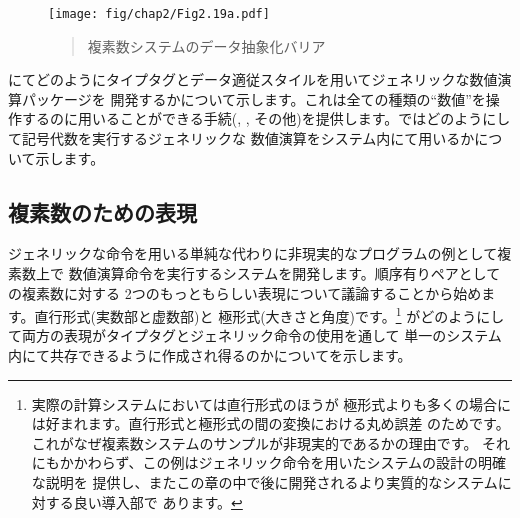 \begin{figure}[tb]
\label{Figure 2.19}
\centering
\begin{comment}
\begin{quote}
\heading{Figure 2.19:} Data-abstraction barriers in the complex-number system.

\begin{example}
           Programs that use complex numbers
  +-------------------------------------------------+
--| add-complex sub-complex mul-complex div-complex |--
  +-------------------------------------------------+
              Complex arithmetic package
---------------------------+---------------------------
          Rectangular      |         Polar
        representation     |     representation
---------------------------+---------------------------
    List structure and primitive machine arithmetic
\end{example}
\end{quote}
\end{comment}
\texttt{[image: fig/chap2/Fig2.19a.pdf]}
\begin{quote}
 複素数システムのデータ抽象化バリア
\end{quote}
\end{figure}

\noindent
{}にてどのようにタイプタグとデータ適従スタイルを用いてジェネリックな数値演算パッケージを
開発するかについて示します。これは全ての種類の``数値''を操作するのに用いることができる手続(,
, その他)を提供します。ではどのようにして記号代数を実行するジェネリックな
数値演算をシステム内にて用いるかについて示します。


\subsection{複素数のための表現}
\label{Section 2.4.1}
\label{Sec. 2.4.1}



ジェネリックな命令を用いる単純な代わりに非現実的なプログラムの例として複素数上で
数値演算命令を実行するシステムを開発します。順序有りペアとしての複素数に対する
2つのもっともらしい表現について議論することから始めます。直行形式(実数部と虚数部)と
極形式(大きさと角度)です。\footnote{実際の計算システムにおいては直行形式のほうが
極形式よりも多くの場合には好まれます。直行形式と極形式の間の変換における丸め誤差
のためです。これがなぜ複素数システムのサンプルが非現実的であるかの理由です。
それにもかかわらず、この例はジェネリック命令を用いたシステムの設計の明確な説明を
提供し、またこの章の中で後に開発されるより実質的なシステムに対する良い導入部で
あります。}
がどのようにして両方の表現がタイプタグとジェネリック命令の使用を通して
単一のシステム内にて共存できるように作成され得るのかについてを示します。


